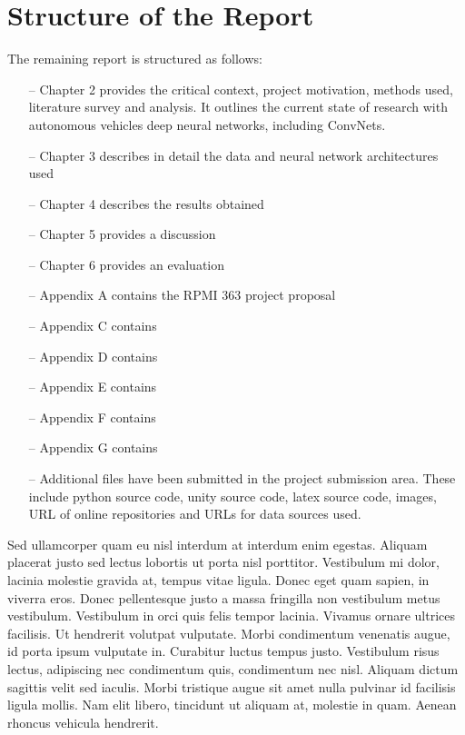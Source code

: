 
\section{Structure of the Report}

The remaining report is structured as follows:
\begin{itemize}
    \item[--] Chapter 2 provides the critical context, project motivation, methods used, literature survey and analysis. It outlines the current state of research with autonomous vehicles deep neural networks, including ConvNets.
    \item[--] Chapter 3 describes in detail the data and neural network architectures used
    \item[--] Chapter 4 describes the results obtained
    \item[--] Chapter 5 provides a discussion
    \item[--] Chapter 6 provides an evaluation
    \item[--] Appendix A contains the RPMI 363 project proposal
    \item[--] Appendix C contains
    \item[--] Appendix D contains
    \item[--] Appendix E contains
    \item[--] Appendix F contains
    \item[--] Appendix G contains
    \item[--] Additional files have been submitted in the project submission area. These include python source code, unity source code, latex source code, images, URL of online repositories and URLs for data sources used.
\end{itemize}
Sed ullamcorper quam eu nisl interdum at interdum enim egestas. Aliquam placerat justo sed lectus lobortis ut porta nisl porttitor. Vestibulum mi dolor, lacinia molestie gravida at, tempus vitae ligula. Donec eget quam sapien, in viverra eros. Donec pellentesque justo a massa fringilla non vestibulum metus vestibulum. Vestibulum in orci quis felis tempor lacinia. Vivamus ornare ultrices facilisis. Ut hendrerit volutpat vulputate. Morbi condimentum venenatis augue, id porta ipsum vulputate in. Curabitur luctus tempus justo. Vestibulum risus lectus, adipiscing nec condimentum quis, condimentum nec nisl. Aliquam dictum sagittis velit sed iaculis. Morbi tristique augue sit amet nulla pulvinar id facilisis ligula mollis. Nam elit libero, tincidunt ut aliquam at, molestie in quam. Aenean rhoncus vehicula hendrerit.